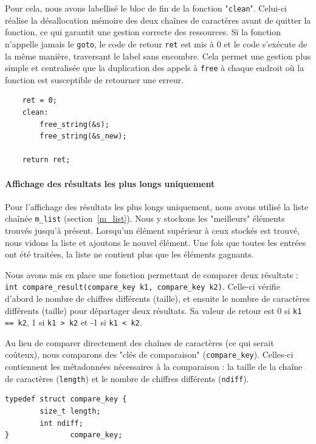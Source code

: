 \documentclass[a4paper,11pt]{article}
\begin{document}
Pour cela, nous avons labellisé le bloc de fin de la fonction "\texttt{clean}". Celui-ci réalise la désallocation mémoire des deux chaînes de caractères avant de quitter la fonction, ce qui garantit une gestion correcte des ressources. Si la fonction n'appelle jamais le \texttt{goto}, le code de retour \texttt{ret} est mis à 0 et le code s'exécute de la même manière, traversant le label sans encombre. Cela permet une gestion plus simple et centralisée que la duplication des appels à \texttt{free} à chaque endroit où la fonction est susceptible de retourner une erreur.

\begin{verbatim}
    ret = 0;
    clean:
        free_string(&s);
        free_string(&s_new);

    return ret;
\end{verbatim}

\paragraph*{Affichage des résultats les plus longs uniquement}

Pour l'affichage des résultats les plus longs uniquement, nous avons utilisé la liste chaînée \texttt{m\_list} (section~\ref{m_list}). Nous y stockons les "meilleurs" éléments trouvés jusqu'à présent. Lorsqu'un élément supérieur à ceux stockés est trouvé, nous vidons la liste et ajoutons le nouvel élément. Une fois que toutes les entrées ont été traitées, la liste ne contient plus que les éléments gagnants.

Nous avons mis en place une fonction permettant de comparer deux résultats : \texttt{int compare\_result(compare\_key k1, compare\_key k2)}. Celle-ci vérifie d'abord le nombre de chiffres différents (taille), et ensuite le nombre de caractères différents (taille) pour départager deux résultats. Sa valeur de retour est 0 si \texttt{k1 == k2}, 1 si \texttt{k1 > k2} et -1 si \texttt{k1 < k2}.

Au lieu de comparer directement des chaînes de caractères (ce qui serait coûteux), nous comparons des "clés de comparaison" (\texttt{compare\_key}). Celles-ci contiennent les métadonnées nécessaires à la comparaison : la taille de la chaîne de caractères (\texttt{length}) et le nombre de chiffres différents (\texttt{ndiff}). 

\begin{verbatim}
typedef struct compare_key {
        size_t length;
        int ndiff;
}              compare_key;
\end{verbatim}
\end{document}
